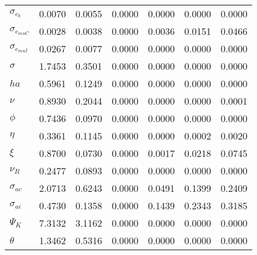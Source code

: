 \begin{center}
\begin{longtable}{lcccccc}
$ \sigma_{{e_b}}       $	 & 	          0.0070	 & 	          0.0055	 & 	          0.0000	 & 	          0.0000	 & 	          0.0000	 & 	          0.0000 \\ 
$ \sigma_{{e_{muC}}}   $	 & 	          0.0028	 & 	          0.0038	 & 	          0.0000	 & 	          0.0036	 & 	          0.0151	 & 	          0.0466 \\ 
$ \sigma_{{e_{muI}}}   $	 & 	          0.0267	 & 	          0.0077	 & 	          0.0000	 & 	          0.0000	 & 	          0.0000	 & 	          0.0000 \\ 
$ {\sigma}             $	 & 	          1.7453	 & 	          0.3501	 & 	          0.0000	 & 	          0.0000	 & 	          0.0000	 & 	          0.0000 \\ 
$ {ha}                 $	 & 	          0.5961	 & 	          0.1249	 & 	          0.0000	 & 	          0.0000	 & 	          0.0000	 & 	          0.0000 \\ 
$ \nu                  $	 & 	          0.8930	 & 	          0.2044	 & 	          0.0000	 & 	          0.0000	 & 	          0.0000	 & 	          0.0001 \\ 
$ {\phi}               $	 & 	          0.7436	 & 	          0.0970	 & 	          0.0000	 & 	          0.0000	 & 	          0.0000	 & 	          0.0000 \\ 
$ {\eta}               $	 & 	          0.3361	 & 	          0.1145	 & 	          0.0000	 & 	          0.0000	 & 	          0.0002	 & 	          0.0020 \\ 
$ \xi                  $	 & 	          0.8700	 & 	          0.0730	 & 	          0.0000	 & 	          0.0017	 & 	          0.0218	 & 	          0.0745 \\ 
$ {\nu_R}              $	 & 	          0.2477	 & 	          0.0893	 & 	          0.0000	 & 	          0.0000	 & 	          0.0000	 & 	          0.0000 \\ 
$ {\sigma_{ac}}        $	 & 	          2.0713	 & 	          0.6243	 & 	          0.0000	 & 	          0.0491	 & 	          0.1399	 & 	          0.2409 \\ 
$ {\sigma_{ai}}        $	 & 	          0.4730	 & 	          0.1358	 & 	          0.0000	 & 	          0.1439	 & 	          0.2343	 & 	          0.3185 \\ 
$ {\Psi_{K}}           $	 & 	          7.3132	 & 	          3.1162	 & 	          0.0000	 & 	          0.0000	 & 	          0.0000	 & 	          0.0000 \\ 
$ {\theta}             $	 & 	          1.3462	 & 	          0.5316	 & 	          0.0000	 & 	          0.0000	 & 	          0.0000	 & 	          0.0000 \\ 

\end{longtable}
\end{center}
